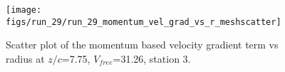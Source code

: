 \begin{figure}[H]
\centering
\texttt{[image: figs/run\_29/run\_29\_momentum\_vel\_grad\_vs\_r\_meshscatter]}
\caption{Scatter plot of the momentum based velocity gradient term vs radius at $z/c$=7.75, $V_{free}$=31.26, station 3.}
\label{fig:run_29_momentum_vel_grad_vs_r_meshscatter}
\end{figure}


